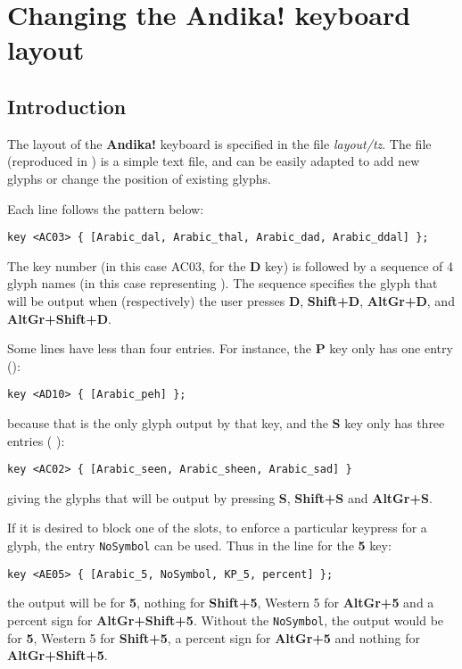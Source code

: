 \chapter{Changing the \textbf{Andika!} keyboard layout}
\renewcommand{\thesection}{C/\arabic{section}}  %
\setcounter{section}{0}  %
\label{appC}

\section{Introduction}

The layout of the \textbf{Andika!} keyboard is specified in the file \textit{layout/tz}.  The file (reproduced in ) is a simple text file, and can be easily adapted to add new glyphs or change the position of existing glyphs.

Each line follows the pattern below:

\verb|key <AC03> { [Arabic_dal, Arabic_thal, Arabic_dad, Arabic_ddal] };|

The key number (in this case AC03, for the \textbf{D} key) is followed by a sequence of 4 glyph names (in this case representing ).  The sequence specifies the glyph that will be output when (respectively) the user presses \textbf{D}, \textbf{Shift+D}, \textbf{AltGr+D}, and \textbf{AltGr+Shift+D}.

Some lines have less than four entries.  For instance, the \textbf{P} key only has one entry ():

\verb|key <AD10> { [Arabic_peh] };|

because that is the only glyph output by that key, and the \textbf{S} key only has three entries ( ):

\verb|key <AC02> { [Arabic_seen, Arabic_sheen, Arabic_sad] }|

giving the glyphs that will be output by pressing \textbf{S}, \textbf{Shift+S} and \textbf{AltGr+S}.

If it is desired to block one of the slots, to enforce a particular keypress for a glyph, the entry \verb|NoSymbol| can be used.  Thus in the line for the \textbf{5} key:

\verb|key <AE05> { [Arabic_5, NoSymbol, KP_5, percent] };|

the output will be  for \textbf{5}, nothing for \textbf{Shift+5}, Western 5 for \textbf{AltGr+5} and a percent sign for \textbf{AltGr+Shift+5}.  Without the \verb|NoSymbol|, the output would be  for \textbf{5}, Western 5 for \textbf{Shift+5}, a percent sign for \textbf{AltGr+5} and nothing for \textbf{AltGr+Shift+5}.

